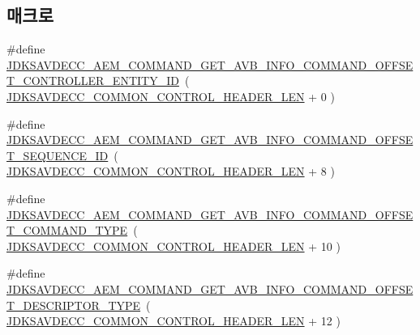 \subsection*{매크로}
\begin{DoxyCompactItemize}
\item 
\#define \hyperlink{group__command__get__avb__info_ga98dad4d7f7a18ee0c056c7fb95abb881}{J\+D\+K\+S\+A\+V\+D\+E\+C\+C\+\_\+\+A\+E\+M\+\_\+\+C\+O\+M\+M\+A\+N\+D\+\_\+\+G\+E\+T\+\_\+\+A\+V\+B\+\_\+\+I\+N\+F\+O\+\_\+\+C\+O\+M\+M\+A\+N\+D\+\_\+\+O\+F\+F\+S\+E\+T\+\_\+\+C\+O\+N\+T\+R\+O\+L\+L\+E\+R\+\_\+\+E\+N\+T\+I\+T\+Y\+\_\+\+ID}~( \hyperlink{group__jdksavdecc__avtp__common__control__header_gaae84052886fb1bb42f3bc5f85b741dff}{J\+D\+K\+S\+A\+V\+D\+E\+C\+C\+\_\+\+C\+O\+M\+M\+O\+N\+\_\+\+C\+O\+N\+T\+R\+O\+L\+\_\+\+H\+E\+A\+D\+E\+R\+\_\+\+L\+EN} + 0 )
\item 
\#define \hyperlink{group__command__get__avb__info_ga11ebc6b33577d83d5552c74c2123b5f9}{J\+D\+K\+S\+A\+V\+D\+E\+C\+C\+\_\+\+A\+E\+M\+\_\+\+C\+O\+M\+M\+A\+N\+D\+\_\+\+G\+E\+T\+\_\+\+A\+V\+B\+\_\+\+I\+N\+F\+O\+\_\+\+C\+O\+M\+M\+A\+N\+D\+\_\+\+O\+F\+F\+S\+E\+T\+\_\+\+S\+E\+Q\+U\+E\+N\+C\+E\+\_\+\+ID}~( \hyperlink{group__jdksavdecc__avtp__common__control__header_gaae84052886fb1bb42f3bc5f85b741dff}{J\+D\+K\+S\+A\+V\+D\+E\+C\+C\+\_\+\+C\+O\+M\+M\+O\+N\+\_\+\+C\+O\+N\+T\+R\+O\+L\+\_\+\+H\+E\+A\+D\+E\+R\+\_\+\+L\+EN} + 8 )
\item 
\#define \hyperlink{group__command__get__avb__info_gae228ba4c7dcadb35d1647771ec79ea37}{J\+D\+K\+S\+A\+V\+D\+E\+C\+C\+\_\+\+A\+E\+M\+\_\+\+C\+O\+M\+M\+A\+N\+D\+\_\+\+G\+E\+T\+\_\+\+A\+V\+B\+\_\+\+I\+N\+F\+O\+\_\+\+C\+O\+M\+M\+A\+N\+D\+\_\+\+O\+F\+F\+S\+E\+T\+\_\+\+C\+O\+M\+M\+A\+N\+D\+\_\+\+T\+Y\+PE}~( \hyperlink{group__jdksavdecc__avtp__common__control__header_gaae84052886fb1bb42f3bc5f85b741dff}{J\+D\+K\+S\+A\+V\+D\+E\+C\+C\+\_\+\+C\+O\+M\+M\+O\+N\+\_\+\+C\+O\+N\+T\+R\+O\+L\+\_\+\+H\+E\+A\+D\+E\+R\+\_\+\+L\+EN} + 10 )
\item 
\#define \hyperlink{group__command__get__avb__info_ga7f64d0540cbbe90207ef25e815343cd8}{J\+D\+K\+S\+A\+V\+D\+E\+C\+C\+\_\+\+A\+E\+M\+\_\+\+C\+O\+M\+M\+A\+N\+D\+\_\+\+G\+E\+T\+\_\+\+A\+V\+B\+\_\+\+I\+N\+F\+O\+\_\+\+C\+O\+M\+M\+A\+N\+D\+\_\+\+O\+F\+F\+S\+E\+T\+\_\+\+D\+E\+S\+C\+R\+I\+P\+T\+O\+R\+\_\+\+T\+Y\+PE}~( \hyperlink{group__jdksavdecc__avtp__common__control__header_gaae84052886fb1bb42f3bc5f85b741dff}{J\+D\+K\+S\+A\+V\+D\+E\+C\+C\+\_\+\+C\+O\+M\+M\+O\+N\+\_\+\+C\+O\+N\+T\+R\+O\+L\+\_\+\+H\+E\+A\+D\+E\+R\+\_\+\+L\+EN} + 12 )
\item 

\end{DoxyCompactItemize}
